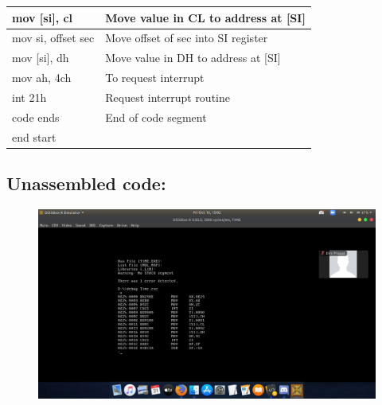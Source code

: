 \documentclass[10pt,a4paper]{article}
\begin{document}
\begin{flushleft}
\begin{table}[htb]
{\begin{tabular}{|l|l|}
\hline
mov [si], cl                                                     & Move value in CL to address at [SI]           \\
\hline
mov si, offset sec                                               & Move offset of sec into SI register           \\
\hline
mov [si], dh                                                     & Move value in DH to address at [SI]           \\
\hline
mov ah, 4ch                                                      & To request interrupt                          \\
\hline
int 21h                                                          & Request interrupt routine                     \\ 
\hline
code ends                                                        & End of code segment                           \\
\hline
end start                                                        &                                               \\
\hline
\end{tabular}
}
\end{table}

\newpage
\subsection*{\textbf{Unassembled code:}}
\begin{figure}[h]
    \centering
    \includegraphics[trim = 100mm 60mm 200mm 110mm, clip, width = \textwidth]{Pics/TimeUS.png}
\end{figure}

\end{flushleft}
\end{document}
